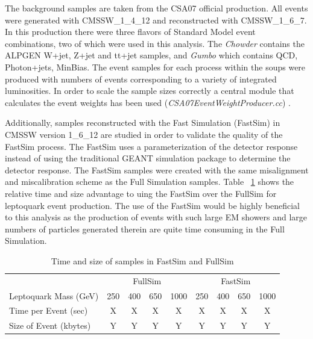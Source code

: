 \documentclass{cmspaper}
\begin{document}
The background samples are taken from the CSA07 official production.  All events were generated with CMSSW\_1\_4\_12 and reconstructed with CMSSW\_1\_6\_7.  In this production there were three flavors of Standard Model event combinations, two of which were used in this analysis.  The {\sl Chowder} contains the ALPGEN W+jet, Z+jet and tt+jet samples, and {\sl Gumbo} which contains QCD, Photon+jets, MinBias.  The event samples for each process within the soups were produced with numbers of events corresponding to a variety of integrated luminosities.  In order to scale the sample sizes correctly a central module that calculates the event weights has been used ({\sl CSA07EventWeightProducer.cc}) . 


Additionally, samples reconstructed with the Fast Simulation (FastSim) in CMSSW version 1\_6\_12 are studied in order to validate the quality of the FastSim process.  The FastSim uses a parameterization of the detector response instead of using the traditional GEANT simulation package to determine the detector response.  The FastSim samples were created with the same misalignment and miscalibration scheme as the Full Simulation samples. Table ~\ref{tab:FastVsFullSim} shows the relative time and size advantage to uing the FastSim over the FullSim for leptoquark event production.  The use of the FastSim would be highly beneficial to this analysis as the production of events with such large EM showers and large numbers of particles generated therein are quite time consuming in the Full Simulation.  

  \begin{table}[htb]
    \caption{Time and size of samples in FastSim and FullSim}
    \label{tab:FastVsFullSim}
    \begin{center}
      \begin{tabular}{|l|cccc|cccc|} \hline
               & \multicolumn{4}{c|}{FullSim} & \multicolumn{4}{c|}{FastSim} \\ 
        Leptoquark Mass (GeV) & 250 & 400 & 650 & 1000 &
                  250 & 400 & 650 & 1000  \\ \hline
        Time per Event (sec) & X  &  X  & X  &  X  &  X  &  X  &  X  &  X   \\
        Size of Event (kbytes)  & Y & Y & Y &  Y & Y & Y & Y & Y \\ \hline
      \end{tabular}
    \end{center}
  \end{table}
\end{document}
